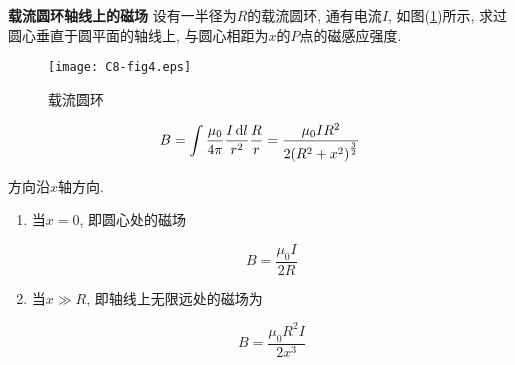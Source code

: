 \begin{example}
	\textbf{载流圆环轴线上的磁场} \quad 设有一半径为$R$的载流圆环, 通有电流$I$, 如图(\ref{C8-fig4})所示, 求过圆心垂直于圆平面的轴线上, 与圆心相距为$x$的$P$点的磁感应强度.
	
	\begin{figure}[H]
		\centering
		\texttt{[image: C8-fig4.eps]}
		\caption{载流圆环}
		\label{C8-fig4}
	\end{figure}
	 
	\begin{solution}
		
		\begin{equation*}
			B = \int \dfrac{\mu_0}{4 \pi} \dfrac{I \dd{l}}{r^2} \dfrac{R}{r} = \dfrac{\mu_0 I R^2}{2 \qty(R^2 + x^2)^{\frac{3}{2}}} 
		\end{equation*}
		
		方向沿$x$轴方向. 
		
		\begin{enumerate}[itemindent=1em]
			
			\item 当$x = 0$, 即圆心处的磁场
			
			\begin{equation*}
				B = \dfrac{\mu_0 I}{2 R}
			\end{equation*}
			
			\item 当$x \gg R$, 即轴线上无限远处的磁场为
			
			\begin{equation*}
				B = \dfrac{\mu_0 R^2 I}{2 x^3}
			\end{equation*}
			
		\end{enumerate}
		
	\end{solution}
	
\end{example}


